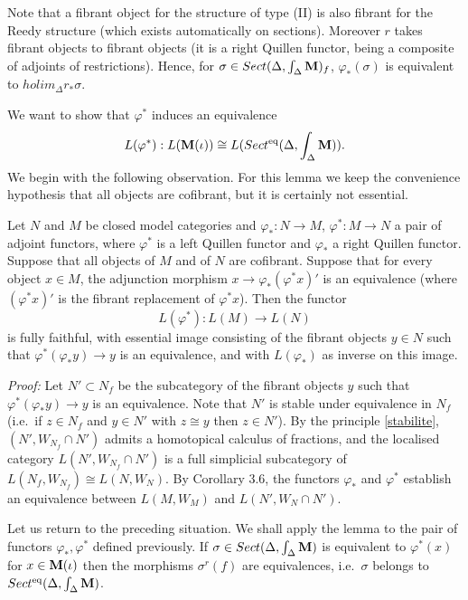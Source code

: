 Note that a fibrant object for the structure of type (II) is also fibrant
for the Reedy structure (which exists automatically on sections).
Moreover $r$ takes fibrant objects to fibrant objects
(it is a right Quillen functor, being a composite of adjoints of
restrictions). Hence, for $\sigma \in Sect (\Delta , \int _{\Delta} {\bf M} )_f$,
$\varphi _{\ast} (\sigma )$ is equivalent to $holim _{\Delta}r_{\ast}\sigma $.


We want to show that $\varphi ^{\ast}$ induces an equivalence
$$
L(\varphi ^{\ast} ): L({\bf M} (\iota ))\cong
L(Sect ^{\rm eq}(\Delta , \int _{\Delta} {\bf M} )).
$$
We begin with the following observation. For this lemma we keep the
convenience hypothesis that all objects are cofibrant, but it is certainly
not essential.


\begin{lemma}
\label{dpq1}
Let $N$ and $M$ be closed model categories and
$\varphi _{\ast} : N\rightarrow M$, $\varphi ^{\ast} : M\rightarrow N$ a
pair of adjoint functors,
where $\varphi ^{\ast}$ is a left Quillen functor and
$\varphi _{\ast}$ a
right Quillen functor. Suppose that all objects of $M$ and
of $N$ are cofibrant. Suppose that for every object $x\in M$, the adjunction
morphism $x\rightarrow \varphi _{\ast} (\varphi ^{\ast} x)'$ is an
equivalence (where $(\varphi ^{\ast}
x)'$ is the fibrant replacement of $\varphi ^{\ast} x$).
\newline Then the functor
$$
L(\varphi ^{\ast} ) : L(M)\rightarrow L(N)
$$
is fully faithful, with essential image
consisting of the fibrant objects $y\in N$
such that $\varphi ^{\ast} (\varphi _{\ast} y)\rightarrow y$ is an
equivalence, and with
$L(\varphi _{\ast} )$ as inverse on this image.
\end{lemma}
{\em Proof:}
Let $N'\subset N_f$ be the subcategory of the fibrant objects $y$ such that
$\varphi ^{\ast} (\varphi _{\ast} y)\rightarrow y$
is an equivalence. Note that $N'$ is stable under equivalence in $N_f$
(i.e.\ if $z\in N_f$
and $y\in N'$ with $z\cong y$ then $z\in N'$). By the principle \ref{stabilite},
$(N',W_{N_f}\cap N')$ admits a homotopical calculus of fractions, and the
localised category
$L(N',W_{N_f}\cap N')$ is a full simplicial subcategory of
$L(N_f,W_{N_f})\cong L(N,W_N)$. By \cite{DwyerKan2} Corollary 3.6, the
functors $\varphi _{\ast}$ and $\varphi ^{\ast}$ establish an
equivalence between $L(M, W_M)$
and $L(N', W_N\cap N')$.
\eop


Let us return to the preceding situation. We shall apply the lemma to
the pair of
functors $\varphi _{\ast} , \varphi ^{\ast}$ defined previously.
If $\sigma \in
Sect (\Delta , \int _{\Delta} {\bf M} )$ is equivalent to $\varphi ^{\ast}
(x)$ for $x\in
{\bf M} (\iota )$ then the morphisms $\sigma ^r(f)$ are equivalences, i.e.\
$\sigma$ belongs to $Sect ^{\rm eq} (\Delta , \int _{\Delta} {\bf M} )$.


